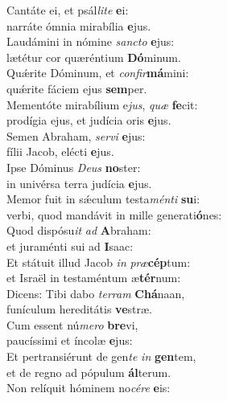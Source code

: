 \evenverse Cantáte ei, et psál\textit{li}\textit{te} \textbf{e}i:~\*\\
\evenverse narráte ómnia mirabília \textbf{e}jus.\\
\oddverse Laudámini in nómine \textit{san}\textit{cto} \textbf{e}jus:~\*\\
\oddverse lætétur cor quæréntium \textbf{Dó}minum.\\
\evenverse Quǽrite Dóminum, et \textit{con}\textit{fir}\textbf{má}mini:~\*\\
\evenverse quǽrite fáciem ejus \textbf{sem}per.\\
\oddverse Mementóte mirabílium e\textit{jus}, \textit{quæ} \textbf{fe}cit:~\*\\
\oddverse prodígia ejus, et judícia oris \textbf{e}jus.\\
\evenverse Semen Abraham, \textit{ser}\textit{vi} \textbf{e}jus:~\*\\
\evenverse fílii Jacob, elécti \textbf{e}jus.\\
\oddverse Ipse Dóminus \textit{De}\textit{us} \textbf{no}ster:~\*\\
\oddverse in univérsa terra judícia \textbf{e}jus.\\
\evenverse Memor fuit in sǽculum testa\textit{mén}\textit{ti} \textbf{su}i:~\*\\
\evenverse verbi, quod mandávit in mille generati\textbf{ó}nes:\\
\oddverse Quod dispósu\textit{it} \textit{ad} \textbf{A}braham:~\*\\
\oddverse et juraménti sui ad \textbf{I}saac:\\
\evenverse Et státuit illud Jacob \textit{in} \textit{præ}\textbf{cép}tum:~\*\\
\evenverse et Israël in testaméntum æ\textbf{tér}num:\\
\oddverse Dicens: Tibi dabo \textit{ter}\textit{ram} \textbf{Chá}naan,~\*\\
\oddverse funículum hereditátis \textbf{ve}stræ.\\
\evenverse Cum essent nú\textit{me}\textit{ro} \textbf{bre}vi,~\*\\
\evenverse paucíssimi et íncolæ \textbf{e}jus:\\
\oddverse Et pertransiérunt de gen\textit{te} \textit{in} \textbf{gen}tem,~\*\\
\oddverse et de regno ad pópulum \textbf{ál}terum.\\
\evenverse Non relíquit hóminem no\textit{cé}\textit{re} \textbf{e}is:~\*\\
